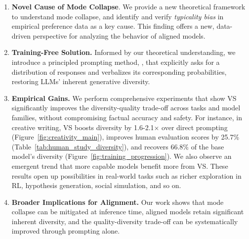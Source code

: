 \begin{enumerate}[leftmargin=15pt, labelwidth=10pt, align=left]
    \item \textbf{Novel Cause of Mode Collapse}. We provide a new theoretical  framework to understand mode collapse, and identify and verify \textit{typicality bias} in empirical preference data as a key cause. %
    This finding offers a new, data-driven perspective for analyzing the behavior of aligned models. %
    

    \item \textbf{Training-Free Solution.} Informed by our theoretical understanding, we introduce a principled prompting method, \textit{\ours}, that explicitly asks for a distribution of responses and verbalizes its corresponding probabilities, restoring LLMs' inherent generative diversity. %
    \item \textbf{Empirical Gains.} We perform comprehensive experiments that show VS significantly improves the diversity-quality trade-off across tasks and model families, without compromising factual accuracy and safety. For instance, in creative writing, VS boosts diversity by 1.6-2.1$\times$ over direct prompting (Figure~\ref{fig:creativity_main}), improves human evaluation scores by 25.7\% (Table~\ref{tab:human_study_diversity}), and recovers 66.8\% of the base model's diversity (Figure~\ref{fig:training_progression}). %
    We also observe an emergent trend that more capable models benefit more from VS. These results open up possibilities in real-world tasks such as richer exploration in RL, hypothesis generation,  social simulation, and so on.
    \item \textbf{Broader Implications for Alignment.} Our work shows that mode collapse can be mitigated at inference time, aligned models retain significant inherent diversity, and the quality-diversity trade-off can be systematically improved through prompting alone.




\end{enumerate}
